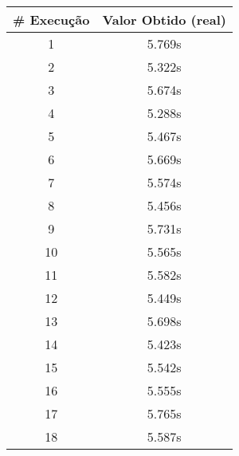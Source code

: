 \documentclass[11pt]{article}
\begin{document}
\begin{table}[!h]
\begin{center}
\begin{minipage}{0.48\textwidth}
\begin{tabular}{| c | c |}
			\hline
				\textbf{\# Execução} &  \textbf{Valor Obtido (real)} \\ \hline
				1 & 5.769s \\ \hline
				2 & 5.322s \\ \hline
				3 & 5.674s \\ \hline
				4 & 5.288s \\ \hline
				5 & 5.467s \\ \hline
				6 & 5.669s \\ \hline
				7 & 5.574s \\ \hline
				8 & 5.456s \\ \hline
				9 & 5.731s \\ \hline
				10 & 5.565s \\ \hline
				11 & 5.582s \\ \hline
				12 & 5.449s \\ \hline
				13 & 5.698s \\ \hline
				14 & 5.423s \\ \hline
				15 & 5.542s \\ \hline
				16 & 5.555s \\ \hline
				17 & 5.765s \\ \hline
				18 & 5.587s \\ \hline
			\end{tabular}
		\end{minipage}
	\end{center}
\end{table}
\end{document}
